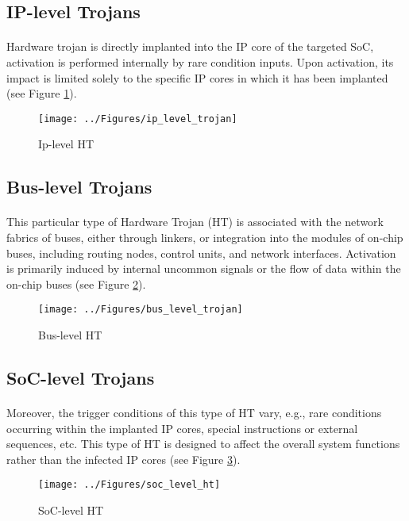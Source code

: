 \subsection*{IP-level Trojans}
\paragraph*{}
Hardware trojan is directly implanted into the IP core of the targeted SoC, activation is performed internally by rare condition inputs. Upon activation, its impact is limited solely to the specific IP cores in which it has been implanted (see Figure \ref{fig:ipleveltrojan}).
\begin{figure}[h]
	\centering
	\texttt{[image: ../Figures/ip\_level\_trojan]}
	\caption{Ip-level HT}
	\label{fig:ipleveltrojan}
\end{figure}

\subsection*{Bus-level Trojans}
\paragraph*{}
This particular type of Hardware Trojan (HT) is associated with the network fabrics of buses, either through linkers, or integration into the modules of on-chip buses, including routing nodes, control units, and network interfaces. Activation is primarily induced by internal uncommon signals or the flow of data within the on-chip buses (see Figure \ref{fig:busleveltrojan}).
\begin{figure}[h]
	\centering
	\texttt{[image: ../Figures/bus\_level\_trojan]}
	\caption{Bus-level HT}
	\label{fig:busleveltrojan}
\end{figure}

\subsection*{SoC-level Trojans}
\paragraph*{}
Moreover, the trigger conditions of this type of HT vary,
e.g., rare conditions occurring within the implanted IP
cores, special instructions or external sequences, etc.
This type of HT is designed to affect the overall system
functions rather than the infected IP cores (see Figure \ref{fig:soclevelht}).
\begin{figure}[h]
	\centering
	\texttt{[image: ../Figures/soc\_level\_ht]}
	\caption{SoC-level HT}
	\label{fig:soclevelht}
\end{figure}

